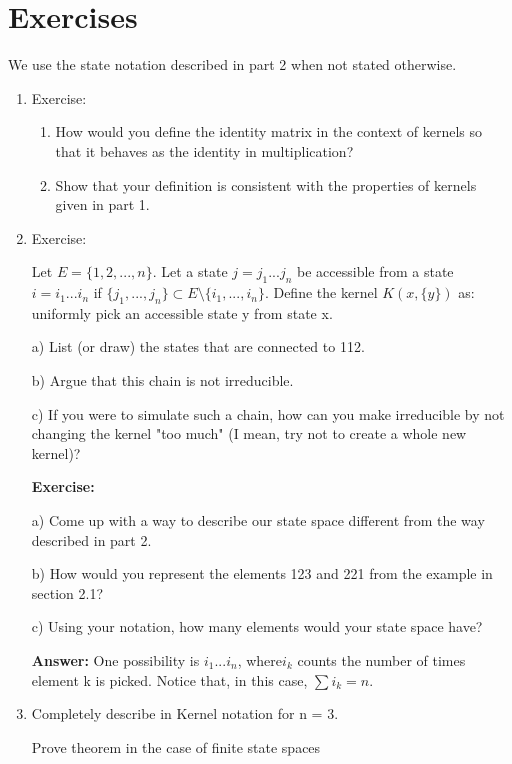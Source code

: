

\section{Exercises}

We use the state notation described in part 2 when not stated otherwise.

\begin{enumerate}
\item Exercise:

\begin{enumerate}
\item How would you define the identity matrix in the context of kernels so that it behaves as the identity in multiplication? 
\item Show that your definition is consistent with the properties of kernels given in part 1.
\end{enumerate}





\item Exercise:

Let $E = \{1, 2, ..., n\}$. Let a state $j = j_1...j_n$ be accessible from a state $i = i_1...i_n$ if $\{j_1, ..., j_n\} \subset E \setminus \{i_1, ..., i_n\} $. Define the kernel $K(x, \{y\})$ as: uniformly pick an accessible state y from state x. 

a) List (or draw) the states that are connected to 112.

b) Argue that this chain is not irreducible.

c) If you were to simulate such a chain, how can you make irreducible by not changing the kernel "too much" (I mean, try not to create a whole new kernel)?

\textbf{Exercise:} 

a) Come up with a way to describe our state space different from the way described in part 2.

b) How would you represent the elements 123 and 221 from the example in section 2.1?

c) Using your notation, how many elements would your state space have? 

\textbf{Answer:} One possibility is $i_1 ... i_n$, where$ i_k$ counts the number of times element k is picked. Notice that, in this case, $\sum i_k = n$. 

\item Completely describe in Kernel notation for n = 3.

Prove theorem in the case of finite state spaces

\end{enumerate}


